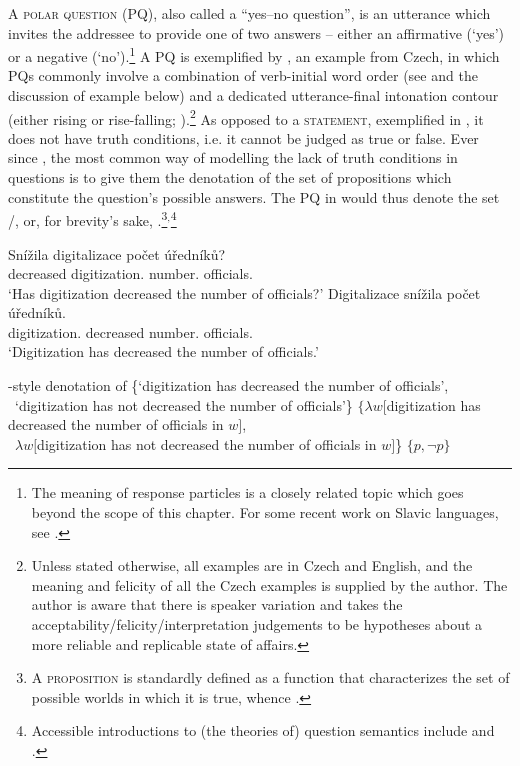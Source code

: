 \documentclass[output=paper,colorlinks,citecolor=brown]{langscibook}
\begin{document}
A \textsc{polar question} (PQ), also called a ``yes--no question'', is an utterance which invites the addressee to provide one of two answers -- either an affirmative (`yes') or a negative (`no').\footnote{The meaning of response particles is a closely related topic which goes beyond the scope of this chapter. For some recent work on Slavic languages, see \citet{Esipova2021,Geist.Repp2023,Hrdinkova.Simik2025}.} A PQ is exemplified by , an example from Czech, in which PQs commonly involve a combination of verb-initial word order (see \citealt{Stankova2023} and the discussion of example  below) and a dedicated utterance-final intonation contour (either rising or rise-falling; \citealt{Danes1957,Veronkova2002}).\footnote{Unless stated otherwise, all examples are in Czech and English, and the meaning and felicity of all the Czech examples is supplied by the author. The author is aware that there is speaker variation and takes the acceptability/felicity/interpretation judgements to be hypotheses about a more reliable and replicable state of affairs.} As opposed to a \textsc{statement}, exemplified in , it does not have truth conditions, i.e. it cannot be judged as true or false. Ever since \citet{Hamblin1973}, the most common way of modelling the lack of truth conditions in questions is to give them the denotation of the set of propositions which constitute the question's possible answers. The PQ in  would thus denote the set /, or, for brevity's sake, .\footnote{A \textsc{proposition} is standardly defined as a function that characterizes the set of possible worlds in which it is true, whence .}$^,$\footnote{Accessible introductions to (the theories of) question semantics include \citet{Hagstrom2003} and \citet{Cross.Roelofsen2014}.}

\ea\label{sim:ex:pq1-cz-all}\ea\gll Snížila digitalizace počet úředníků?\label{sim:ex:pq1-cz}\\
decreased digitization.{\NOM} number.{\ACC} officials.{\GEN}\\
\glt `Has digitization decreased the number of officials?'
\ex\gll Digitalizace snížila počet úředníků.\label{sim:ex:ass-cz}\\
digitization.{\NOM} decreased number.{\ACC} officials.{\GEN}\\
\glt `Digitization has decreased the number of officials.'
\z\z

\ea \citet{Hamblin1973}-style denotation of \label{sim:denot-pq-hamblin}
\ea \{`digitization has decreased the number of officials',\\
~`digitization has not decreased the number of officials'\}\label{sim:ex:pq-denot1}
\ex $\{\lambda w[$digitization has decreased the number of officials in $w]$,\\
~$\lambda w[$digitization has not decreased the number of officials in $w]$\}\label{sim:ex:pq-denot1x}
\ex $\{p,\neg p\}$\label{sim:ex:pq-denot1a}
\z\z
\end{document}
